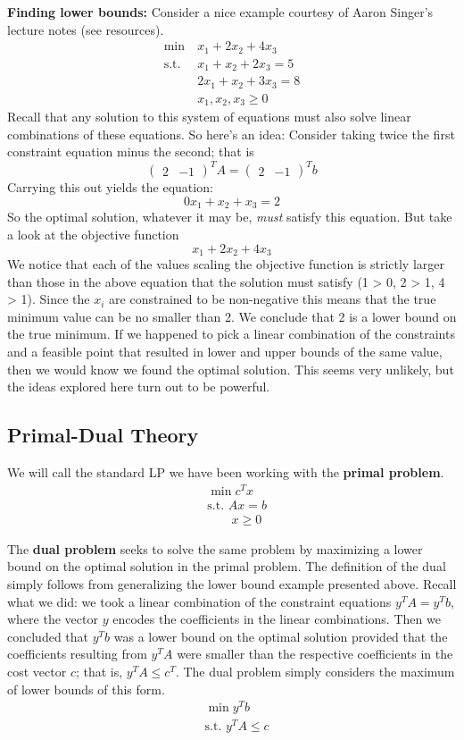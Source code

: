 \documentclass[12pt]{article}
\begin{document}
\textbf{Finding lower bounds:} Consider a nice example courtesy of Aaron Singer's lecture notes (see resources). 
\begin{align*}
\min \ &x_1 + 2x_2 + 4x_3 \\
 \text{s.t. } &x_1 + x_2 + 2x_3 = 5 \\
 &2x_1 + x_2 + 3x_3 = 8 \\
 &x_1, x_2, x_3 \geq 0
\end{align*}
Recall that any solution to this system of equations must also solve linear combinations of these equations. So here's an idea: Consider taking twice the first 
constraint equation minus the second; that is
\[\begin{pmatrix} 2 & -1\end{pmatrix}^T A = \begin{pmatrix} 2 & -1\end{pmatrix}^Tb\]
Carrying this out yields the equation: 
\[0x_1 + x_2 + x_3 = 2\]
So the optimal solution, whatever it may be, \textit{must} satisfy this equation. But take a look at the objective function
\[x_1 + 2x_2 + 4x_3\]
We notice that each of the values scaling the objective function is strictly larger than those in the above equation that the solution must satisfy 
(1 > 0, 2 > 1, 4 > 1). Since the $x_i$ are constrained to be non-negative this means that the true minimum value can be no smaller than 2. We conclude 
that 2 is a lower bound on the true minimum. If we happened to pick a linear combination of the constraints and a feasible point that resulted in lower and 
upper bounds of the same value, then we would know we found the optimal solution. This seems very unlikely, but the ideas explored here turn out to 
be powerful. 

\subsection{Primal-Dual Theory}
We will call the standard LP we have been working with the \textbf{primal problem}. 
\begin{align*}
&\min c^T x \\
&\text{s.t. } Ax = b \\
&\;\;\;\;\;\;\; x \geq 0
\end{align*}

The \textbf{dual problem} seeks to solve the same problem by maximizing a lower bound on the optimal solution in the primal problem. The definition of the dual simply 
follows from generalizing the lower bound example presented above. Recall what we did: we took a linear combination of the constraint equations $y^T A = y^T b$, where 
the vector $y$ encodes the coefficients in the linear combinations. Then we concluded that $y^T b$ was a lower bound on the optimal solution provided that the coefficients
resulting from $y^T A$ were smaller than the respective coefficients in the cost vector $c$; that is, $y^T A \leq c^T$. The dual problem simply considers the maximum of lower 
bounds of this form. 
\begin{align*}
&\min y^T b \\
&\text{s.t. } y^T A \leq c \\
\end{align*}
\end{document}
